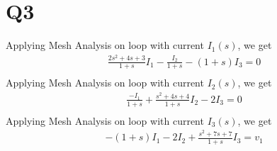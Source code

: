\documentclass[10pt]{article}
\begin{document}
 
\section*{Q3}
Applying Mesh Analysis on loop with current $I_1(s)$, we get
\begin{align*}
    \frac{2s^2+4s+3}{1+s}I_1 - \frac{I_2}{1+s} - (1+s)I_3 = 0\\
\end{align*}
Applying Mesh Analysis on loop with current $I_2(s)$, we get
\begin{align*}
    \frac{-I_1}{1+s} + \frac{s^2+4s+4}{1+s}I_2 - 2I_3 = 0\\
\end{align*}
Applying Mesh Analysis on loop with current $I_3(s)$, we get
\begin{align*}
    -(1+s)I_1 - 2I_2 + \frac{s^2+7s+7}{1+s}I_3 = v_1\\
\end{align*}
\end{document}
